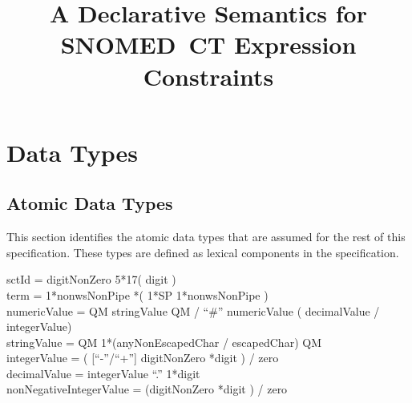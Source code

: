 \documentclass{article}
\title{A Declarative Semantics for SNOMED~CT Expression Constraints}
\def\bnf#1{{\scriptsize {{#1}} }}
\begin{document}
\maketitle
\tableofcontents
\pagebreak
\section{Data Types}
\subsection{Atomic Data Types}
This section identifies the atomic data types that are assumed for the rest of this specification.  These types
are defined as lexical components in the specification.
\begin{framed}
\noindent
\bnf{sctId = digitNonZero 5*17( digit )} \\
\bnf{term = 1*nonwsNonPipe *( 1*SP 1*nonwsNonPipe )} \\
\bnf{numericValue =  QM stringValue QM / ``\#'' numericValue ( decimalValue / integerValue)} \\
\bnf{stringValue =  QM 1*(anyNonEscapedChar / escapedChar) QM} \\
\bnf{integerValue = ( [``-''/``+''] digitNonZero *digit ) / zero} \\
\bnf{decimalValue = integerValue ``.'' 1*digit} \\
\bnf{nonNegativeIntegerValue = (digitNonZero *digit ) / zero}
\end{framed}
\end{document}
